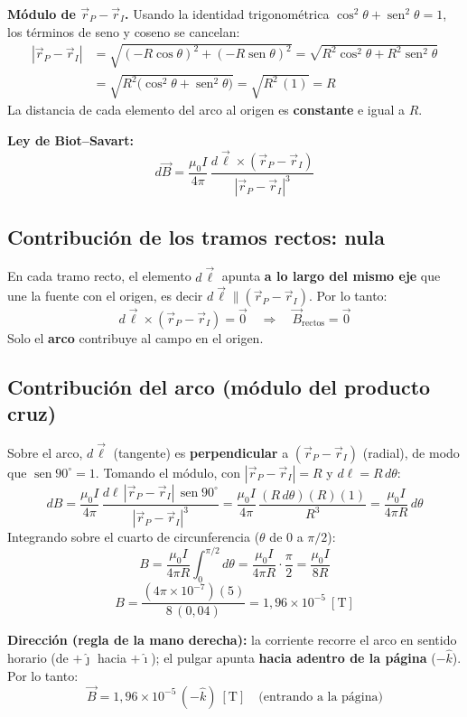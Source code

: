 \documentclass[12pt,letterpaper]{article}
\begin{document}
\medskip

\noindent\textbf{M\'odulo de $\vec{r}_{P}-\vec{r}_{I}$.} Usando la identidad trigonom\'etrica
$\cos^2\theta + \operatorname{sen}^2\theta = 1$, los t\'erminos de seno y coseno se cancelan:
\begin{align*}
    |\vec{r}_{P}-\vec{r}_{I}|
       &= \sqrt{(-R\cos\theta)^2 + (-R\operatorname{sen}\theta)^2}
        = \sqrt{R^2\cos^2\theta + R^2\operatorname{sen}^2\theta} \\
       &= \sqrt{R^2\big(\cos^2\theta + \operatorname{sen}^2\theta\big)}
        = \sqrt{R^2\,(1)} = R
\end{align*}
La distancia de cada elemento del arco al origen es \textbf{constante} e igual a $R$.

\medskip

\noindent\textbf{Ley de Biot--Savart:}
\[
    d\vec{B} = \frac{\mu_0 I}{4\pi}\,\frac{d\vec{\ell}\times(\vec{r}_{P}-\vec{r}_{I})}{|\vec{r}_{P}-\vec{r}_{I}|^3}
\]

\subsection*{Contribuci\'on de los tramos rectos: nula}
En cada tramo recto, el elemento $d\vec{\ell}$ apunta \textbf{a lo largo del mismo eje} que une la
fuente con el origen, es decir $d\vec{\ell} \parallel (\vec{r}_{P}-\vec{r}_{I})$. Por lo tanto:
\[
    d\vec{\ell}\times(\vec{r}_{P}-\vec{r}_{I}) = \vec{0}
    \quad\Longrightarrow\quad
    \vec{B}_{\text{rectos}} = \vec{0}
\]
Solo el \textbf{arco} contribuye al campo en el origen.

\subsection*{Contribuci\'on del arco (m\'odulo del producto cruz)}
Sobre el arco, $d\vec{\ell}$ (tangente) es \textbf{perpendicular} a $(\vec{r}_{P}-\vec{r}_{I})$
(radial), de modo que $\operatorname{sen}90^\circ = 1$. Tomando el m\'odulo, con
$|\vec{r}_{P}-\vec{r}_{I}| = R$ y $d\ell = R\,d\theta$:
\[
    dB = \frac{\mu_0 I}{4\pi}\,\frac{d\ell\,|\vec{r}_{P}-\vec{r}_{I}|\,\operatorname{sen}90^\circ}{|\vec{r}_{P}-\vec{r}_{I}|^3}
       = \frac{\mu_0 I}{4\pi}\,\frac{(R\,d\theta)(R)(1)}{R^3}
       = \frac{\mu_0 I}{4\pi R}\,d\theta
\]
Integrando sobre el cuarto de circunferencia ($\theta$ de $0$ a $\pi/2$):
\[
    B = \frac{\mu_0 I}{4\pi R}\int_{0}^{\pi/2} d\theta
      = \frac{\mu_0 I}{4\pi R}\cdot\frac{\pi}{2}
      = \frac{\mu_0 I}{8R}
\]
\[
    B = \frac{(4\pi\times10^{-7})(5)}{8\,(0{,}04)} = 1{,}96\times10^{-5}\ [\text{T}]
\]

\noindent\textbf{Direcci\'on (regla de la mano derecha):} la corriente recorre el arco en sentido
horario (de $+\hat{\jmath}$ hacia $+\hat{\imath}$); el pulgar apunta \textbf{hacia adentro de la
p\'agina} ($-\hat{k}$). Por lo tanto:
\[
    \boxed{\vec{B} = 1{,}96\times10^{-5}\,(-\hat{k})\ [\text{T}]\quad\text{(entrando a la p\'agina)}}
\]
\end{document}
